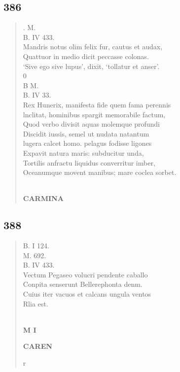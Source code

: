 \documentclass[11pt, a4paper]{report}
\begin{document}
            \subsection*{386}
      \begin{verse}
      . M. \\ B. IV 433. \\ Mandris notus olim felix fur, cautus et audax, \\ Quattuor in medio dicit peccasse colonas. \\ ‘Sive ego sive lupus’, dixit, ‘tollatur et anser’. \\ 0 \\ B M. \\ B. IV 33. \\ Rex Hunerix, manifesta fide quem fama perennis \\ lnclitat, hominibus spargit memorabile factum, \\ Quod verbo divisit aquas molemque profundi \\ Discidit iussis, semel  \lbrack ut \rbrack  nudata natantum \\ lugera calcet homo. pelagus fodisse ligones \\ Expavit natura maris: subducitur unda, \\ Tortilis anfractu liquidus converritur imber, \\ Oceanumque movent manibus; mare coclea sorbet. \\ 
        ﻿\pagebreak 
    \begin{center} \textbf{CARMINA} \end{center} \marginpar{[296]} 
      \end{verse}
  
            \subsection*{388}
      \begin{verse}
      B. I 124. \\ M. 692. \\ B. IV 433. \\ Vectum Pegaseo volucri pendente caballo \\ Conpita senserunt Bellerephonta denm. \\ Cuius iter vacuos et calcans ungula ventos \\ Rlia est. \\ 
        ﻿\pagebreak 
        ﻿\pagebreak 
    \begin{center} \textbf{M I} \end{center}\begin{center} \textbf{CAREN} \end{center}r \\ 
      \end{verse}
  
\end{document}
